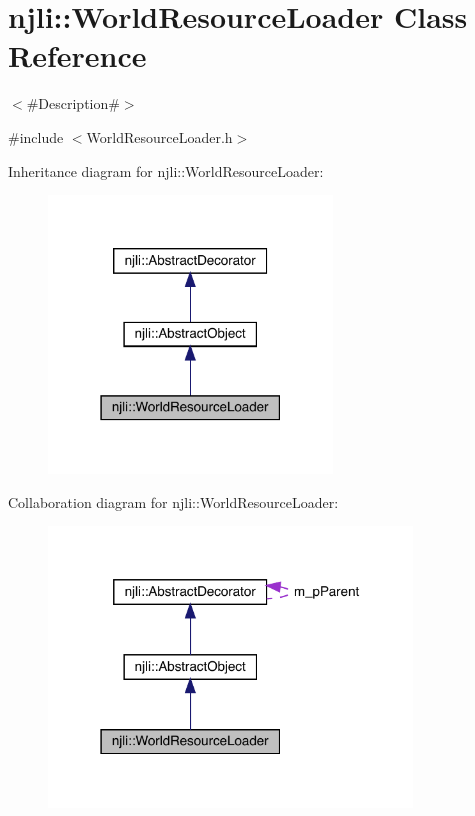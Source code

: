 \hypertarget{classnjli_1_1_world_resource_loader}{}\section{njli\+:\+:World\+Resource\+Loader Class Reference}
\label{classnjli_1_1_world_resource_loader}


$<$\#\+Description\#$>$  




{\ttfamily \#include $<$World\+Resource\+Loader.\+h$>$}



Inheritance diagram for njli\+:\+:World\+Resource\+Loader\+:\nopagebreak
\begin{figure}[H]
\begin{center}
\leavevmode
\includegraphics[width=214pt]{classnjli_1_1_world_resource_loader__inherit__graph}
\end{center}
\end{figure}


Collaboration diagram for njli\+:\+:World\+Resource\+Loader\+:\nopagebreak
\begin{figure}[H]
\begin{center}
\leavevmode
\includegraphics[width=274pt]{classnjli_1_1_world_resource_loader__coll__graph}
\end{center}
\end{figure}
